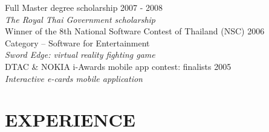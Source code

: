 \documentclass[margin, 10pt]{res} %
\begin{document}
\begin{resume}
Full Master degree scholarship \hfill 2007 - 2008 \\
\textit{The Royal Thai Government scholarship} \vspace{2mm} \\
Winner of the 8th National Software Contest of Thailand (NSC) \hfill 2006 \\ 
Category -- Software for Entertainment \\
\textit{Sword Edge: virtual reality fighting game} \vspace{2mm} \\
DTAC \& NOKIA i-Awards mobile app contest: finalists \hfill 2005  \\
\textit{Interactive e-cards mobile application}
 
 
\section{EXPERIENCE}


\end{resume}
\end{document}

